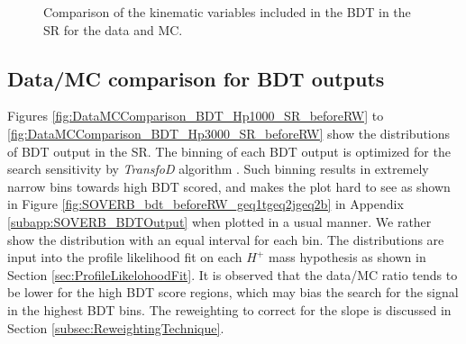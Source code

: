\begin{figure}[H]
  \caption{Comparison of the kinematic variables included in the BDT in the SR for the data and MC.}
  \label{fig:DATAOVERMC_BDTInputs_Prefit}
\end{figure}


\subsection{Data/MC comparison for BDT outputs}
\label{subsec:DataAndMCComparisonOfBDT}
Figures \ref{fig:DataMCComparison_BDT_Hp1000_SR_beforeRW} to \ref{fig:DataMCComparison_BDT_Hp3000_SR_beforeRW} show the distributions of BDT output in the SR. The binning of each BDT output is optimized for the search sensitivity by \textit{TransfoD} algorithm \cite{Binning-TTHFilter}. Such binning results in extremely narrow bins towards high BDT scored, and makes the plot hard to see as shown in Figure \ref{fig:SOVERB_bdt_beforeRW_geq1tgeq2jgeq2b} in Appendix \ref{subapp:SOVERB_BDTOutput} when plotted in a usual manner. We rather show the distribution with an equal interval for each bin. The distributions are input into the profile likelihood fit on each $H^{+}$ mass hypothesis as shown in Section \ref{sec:ProfileLikelohoodFit}. It is observed that the data/MC ratio tends to be lower for the high BDT score regions, which may bias the search for the signal in the highest BDT bins. The reweighting to correct for the slope is discussed in Section \ref{subsec:ReweightingTechnique}. 

